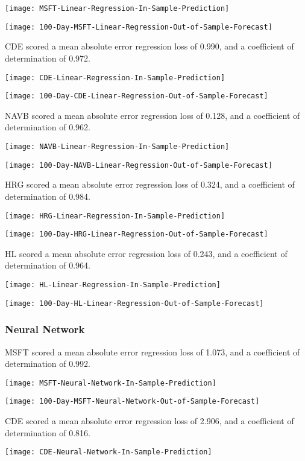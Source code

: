 \texttt{[image: MSFT-Linear-Regression-In-Sample-Prediction]}

\texttt{[image: 100-Day-MSFT-Linear-Regression-Out-of-Sample-Forecast]}

CDE scored a mean absolute error regression loss of 0.990, and a coefficient of determination of 0.972.

\texttt{[image: CDE-Linear-Regression-In-Sample-Prediction]}

\texttt{[image: 100-Day-CDE-Linear-Regression-Out-of-Sample-Forecast]}

NAVB scored a mean absolute error regression loss of 0.128, and a coefficient of determination of 0.962.

\texttt{[image: NAVB-Linear-Regression-In-Sample-Prediction]}

\texttt{[image: 100-Day-NAVB-Linear-Regression-Out-of-Sample-Forecast]}

HRG scored a mean absolute error regression loss of 0.324, and a coefficient of determination of 0.984.

\texttt{[image: HRG-Linear-Regression-In-Sample-Prediction]}

\texttt{[image: 100-Day-HRG-Linear-Regression-Out-of-Sample-Forecast]}

HL scored a mean absolute error regression loss of 0.243, and a coefficient of determination of 0.964.

\texttt{[image: HL-Linear-Regression-In-Sample-Prediction]}

\texttt{[image: 100-Day-HL-Linear-Regression-Out-of-Sample-Forecast]}

\subsubsection{Neural Network}
MSFT scored a mean absolute error regression loss of 1.073, and a coefficient of determination of 0.992.

\texttt{[image: MSFT-Neural-Network-In-Sample-Prediction]}

\texttt{[image: 100-Day-MSFT-Neural-Network-Out-of-Sample-Forecast]}

CDE scored a mean absolute error regression loss of 2.906, and a coefficient of determination of 0.816.

\texttt{[image: CDE-Neural-Network-In-Sample-Prediction]}

